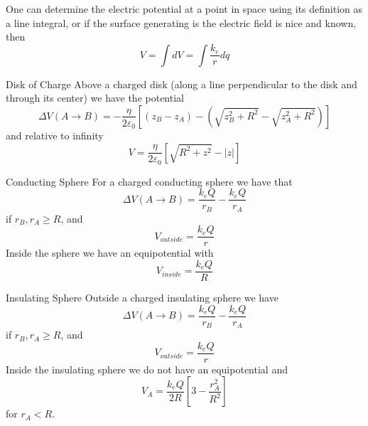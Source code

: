 \documentclass[12pt]{report}
\begin{document}
\begin{rmk}{}{}
        One can determine the electric potential at a point in space using its definition as a line integral, or if the surface generating is the electric field is nice and known, then \begin{equation}
                V = \int dV = \int \frac{k_e}{r}dq
        \end{equation}
\end{rmk}


\begin{prop}{Disk of Charge}{}
        Above a charged disk (along a line perpendicular to the disk and through its center) we have the potential \begin{equation}
                \Delta V(A\rightarrow B) = -\frac{\eta}{2\varepsilon_0}\left[(z_B - z_A) - (\sqrt{z_B^2+R^2} - \sqrt{z_A^2 + R^2})\right]
        \end{equation}
        and relative to infinity \begin{equation}
                V = \frac{\eta}{2\varepsilon_0}\left[\sqrt{R^2+z^2} - |z|\right]
        \end{equation}
\end{prop}


\begin{prop}{Conducting Sphere}{}
        For a charged conducting sphere we have that \begin{equation}
                \Delta V(A\rightarrow B) = \frac{k_eQ}{r_B} - \frac{k_eQ}{r_A}
        \end{equation}
        if $r_B,r_A \geq R$, and \begin{equation}
                V_{outside} = \frac{k_eQ}{r}
        \end{equation}
        Inside the sphere we have an equipotential with \begin{equation}
                V_{inside} = \frac{k_eQ}{R}
        \end{equation}
\end{prop}


\begin{prop}{Insulating Sphere}{}
        Outside a charged insulating sphere we have\begin{equation}
                \Delta V(A\rightarrow B) = \frac{k_eQ}{r_B} - \frac{k_eQ}{r_A}
        \end{equation}
        if $r_B,r_A \geq R$, and \begin{equation}
                V_{outside} = \frac{k_eQ}{r}
        \end{equation}
        Inside the insulating sphere we do not have an equipotential and \begin{equation}
                V_A = \frac{k_eQ}{2R}\left[3 -  \frac{r_A^2}{R^2}\right]
        \end{equation}
        for $r_A < R$.
\end{prop}
\end{document}

